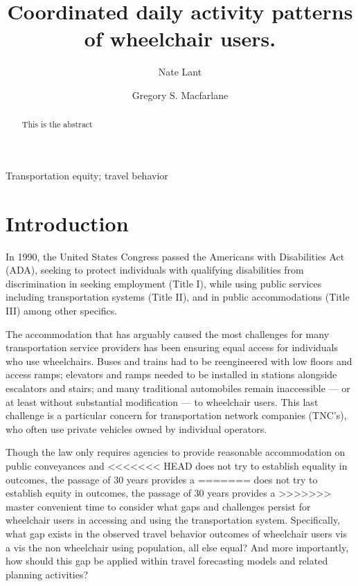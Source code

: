 \documentclass[3p, authoryear, review]{elsarticle} %
\begin{document}
\begin{frontmatter}

  \title{Coordinated daily activity patterns of wheelchair users.}
    \author[BYU]{Nate Lant}
    \author[BYU]{Gregory S. Macfarlane}
      \address[BYU]{Brigham Young University, Civil and Construction Engineering Department, 430 Engineering Building, Provo, Utah 84602}
  
  \begin{abstract}
  This is the abstract
  \end{abstract}
   \begin{keyword} Transportation equity; travel behavior\end{keyword}
 \end{frontmatter}

\hypertarget{intro}{%
\section{Introduction}\label{intro}}

In 1990, the United States Congress passed the Americans with Disabilities Act (ADA),
seeking to protect individuals with qualifying disabilities from discrimination
in seeking employment (Title I), while using public services including
transportation systems (Title II), and in public accommodations (Title III) among
other specifics.

The accommodation that has arguably caused the most challenges
for many transportation service providers has been ensuring equal
access for individuals who use wheelchairs. Buses and trains had to be reengineered
with low floors and access ramps; elevators and ramps needed to be installed
in stations alongside escalators and stairs; and many traditional automobiles
remain inaccessible --- or at least without substantial modification --- to
wheelchair users. This last challenge is a particular concern for transportation
network companies (TNC's), who often use private vehicles owned by individual
operators.

Though the law only requires agencies to provide reasonable accommodation on
public conveyances and
<<<<<<< HEAD
does not try to establish equality in outcomes, the passage of 30 years provides a
=======
does not try to establish equity in outcomes, the passage of 30 years provides a
>>>>>>> master
convenient time to consider what gaps and challenges persist for wheelchair
users in accessing and using the transportation system. Specifically, what gap
exists in the observed travel behavior outcomes of wheelchair users vis a vis
the non wheelchair using population, all else equal? And more importantly, how
should this gap be applied within travel forecasting models and related planning
activities?
\end{document}
